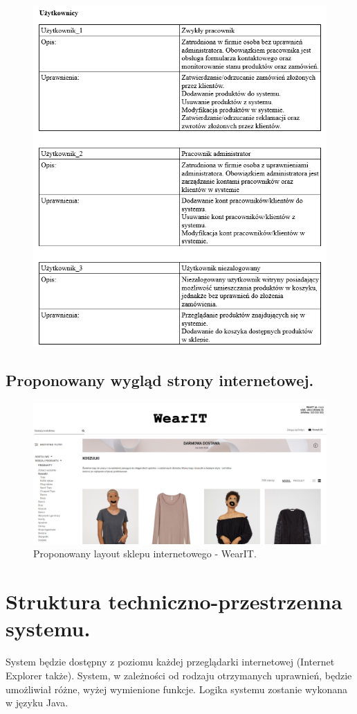 \documentclass[a4paper,11pt]{article}
\begin{document}
\begin{figure}[H]
	\centering
		\includegraphics[width=1.1\textwidth]{pleaseDontJudgeME.png}
\end{figure}




\subsection{Proponowany wygląd strony internetowej.}
\begin{figure}[H]
	\centering
		\includegraphics[width=1\textwidth]{Diagramy/strona.png}
	\caption{Proponowany layout sklepu internetowego - WearIT.}
\end{figure}

\section {Struktura techniczno-przestrzenna systemu.}
System będzie dostępny z poziomu każdej przeglądarki internetowej (Internet Explorer także). System, w zależności od rodzaju otrzymanych uprawnień, będzie umożliwiał różne, wyżej wymienione funkcje. Logika systemu zostanie wykonana w języku Java. 
\end{document}
